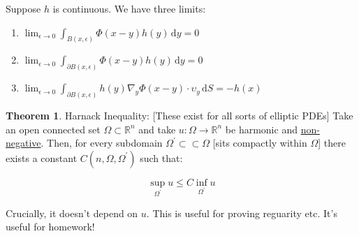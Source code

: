 \documentclass{article}
\theoremstyle{definition}
\newtheorem{theorem}{Theorem}
\begin{document}
Suppose \(h\) is continuous. We have three limits:

\begin{enumerate}
    \item \(\displaystyle \lim_{\epsilon  \to 0} \int_{B(x,\epsilon )}^{} \Phi(x-y)h(y) \,\mathrm{d}y = 0\) 
    \item \(\displaystyle \lim_{\epsilon \to 0} \int_{\partial B(x,\epsilon )}^{} \Phi(x-y)h(y) \,\mathrm{d}y = 0\)
    \item \(\displaystyle \lim_{\epsilon  \to 0} \int_{\partial B(x,\epsilon )}^{} h(y)\nabla_y \Phi(x-y)\cdot \upsilon _y  \,\mathrm{d}S = -h(x)\)  
\end{enumerate}

\begin{theorem}
    Harnack Inequality: [These exist for all sorts of elliptic PDEs] Take an open connected set \(\Omega \subset \mathbb{R} ^n\) and take \(u:\Omega \to \mathbb{R} ^n\) be harmonic and \underline{non-negative}. Then, for every subdomain \(\Omega ^{\prime} \subset \subset \Omega\) [sits compactly within \(\Omega \)] there exists a constant \(C(n,\Omega ,\Omega ^{\prime})\) such that:

    \[
        \sup_{\Omega ^{\prime} } u \leq C \inf _{\Omega ^{\prime} } u
    \]

    Crucially, it doesn't depend on \(u\). This is useful for proving reguarity etc. It's useful for homework!

\end{theorem}
\end{document}
